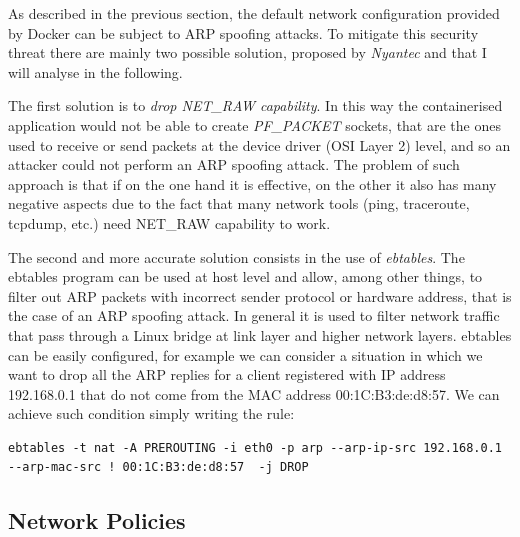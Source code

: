 \documentclass[a4paper,12pt]{article}
\begin{document}
As described in the previous section, the default network configuration provided
by Docker can be subject to ARP spoofing attacks. To mitigate this security
threat there are mainly two possible solution, proposed by \textit{Nyantec}
\cite{nyantec_network_docker} and that I will analyse in the following. \par The
first solution is to \textit{drop NET\_RAW capability}. In this way the
containerised application would not be able to create \textit{PF\_PACKET}
sockets, that are the ones used to receive or send packets at the device driver
(OSI Layer 2) level, and so an attacker could not perform an ARP spoofing
attack. The problem of such approach is that if on the one hand it is effective,
on the other it also has many negative aspects due to the fact that many network
tools (ping, traceroute, tcpdump, etc.) need NET\_RAW capability to work. \par
The second and more accurate solution consists in the use of \textit{ebtables}.
The ebtables program can be used at host level and allow, among other things, to
filter out ARP packets with incorrect sender protocol or hardware address, that
is the case of an ARP spoofing attack. In general it is used to filter network
traffic that pass through a Linux bridge at link layer and higher network
layers. ebtables can be easily configured, for example we can consider a
situation in which we want to drop all the ARP replies for a client registered
with IP address 192.168.0.1 that do not come from the MAC address
00:1C:B3:de:d8:57. We can achieve such condition simply writing the rule:
\begin{lstlisting}
ebtables -t nat -A PREROUTING -i eth0 -p arp --arp-ip-src 192.168.0.1 --arp-mac-src ! 00:1C:B3:de:d8:57  -j DROP
\end{lstlisting}

\subsection{Network Policies}
\end{document}
